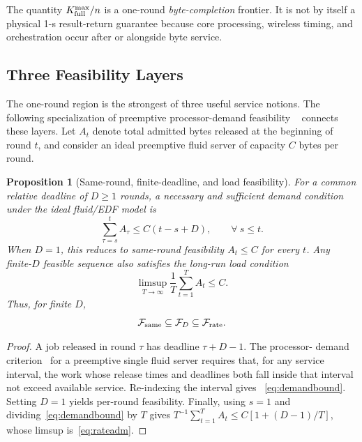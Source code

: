 \documentclass[10pt,journal]{IEEEtran}
\newtheorem{proposition}{Proposition}
\begin{document}
The quantity $K_{\rm full}^{\max}/n$ is a one-round \emph{byte-completion}
frontier. It is not by itself a physical 1-s result-return guarantee because
core processing, wireless timing, and orchestration occur after or alongside
byte service.

\subsection{Three Feasibility Layers}
The one-round region is the strongest of three useful service notions. The
following specialization of preemptive processor-demand feasibility
~\cite{baruah1990feasibility} connects these layers. Let
$A_t$ denote total admitted bytes released at the beginning of round $t$, and
consider an ideal preemptive fluid server of capacity $C$ bytes per round.

\begin{proposition}[Same-round, finite-deadline, and load feasibility]
\label{prop:layers}
For a common relative deadline of $D\geq1$ rounds, a necessary and sufficient
demand condition under the ideal fluid/EDF model is
\begin{equation}
\sum_{\tau=s}^{t} A_\tau
\leq C(t-s+D),\qquad \forall~s\leq t.
\label{eq:demandbound}
\end{equation}
When $D=1$, this reduces to same-round feasibility $A_t\leq C$ for every
$t$. Any finite-$D$ feasible sequence also satisfies the long-run load
condition
\begin{equation}
\limsup_{T\rightarrow\infty}
\frac{1}{T}\sum_{t=1}^{T}A_t\leq C.
\label{eq:rateadm}
\end{equation}
Thus, for finite $D$,
\begin{equation}
\mathcal F_{\rm same}
\subseteq\mathcal F_D
\subseteq\mathcal F_{\rm rate}.
\label{eq:layers}
\end{equation}
\end{proposition}

\begin{proof}
A job released in round $\tau$ has deadline $\tau+D-1$. The processor-
demand criterion~\cite{baruah1990feasibility} for a preemptive single fluid
server requires that, for any
service interval, the work whose release times and deadlines both fall inside
that interval not exceed available service. Re-indexing the interval gives
~\eqref{eq:demandbound}. Setting $D=1$ yields per-round feasibility. Finally,
using $s=1$ and dividing~\eqref{eq:demandbound} by $T$ gives
$T^{-1}\sum_{t=1}^T A_t\leq C[1+(D-1)/T]$, whose limsup is~\eqref{eq:rateadm}.
\end{proof}
\end{document}
